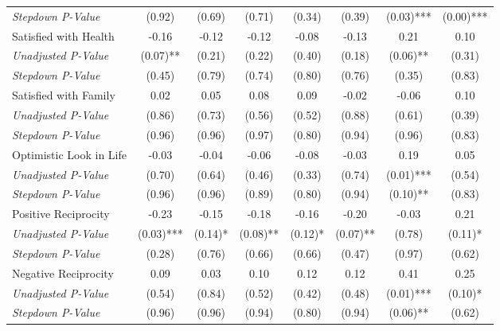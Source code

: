 \begin{tabular}{l c c c c c c c}
\quad \textit{Stepdown P-Value} & (0.92) & (0.69) & (0.71) & (0.34) & (0.39) & (0.03)*** & (0.00)*** \\
Satisfied with Health & -0.16 & -0.12 & -0.12 & -0.08 & -0.13 & 0.21 & 0.10 \\
\quad \textit{Unadjusted P-Value} & (0.07)** & (0.21) & (0.22) & (0.40) & (0.18) & (0.06)** & (0.31) \\
\quad \textit{Stepdown P-Value} & (0.45) & (0.79) & (0.74) & (0.80) & (0.76) & (0.35) & (0.83) \\
Satisfied with Family & 0.02 & 0.05 & 0.08 & 0.09 & -0.02 & -0.06 & 0.10 \\
\quad \textit{Unadjusted P-Value} & (0.86) & (0.73) & (0.56) & (0.52) & (0.88) & (0.61) & (0.39) \\
\quad \textit{Stepdown P-Value} & (0.96) & (0.96) & (0.97) & (0.80) & (0.94) & (0.96) & (0.83) \\
Optimistic Look in Life & -0.03 & -0.04 & -0.06 & -0.08 & -0.03 & 0.19 & 0.05 \\
\quad \textit{Unadjusted P-Value} & (0.70) & (0.64) & (0.46) & (0.33) & (0.74) & (0.01)*** & (0.54) \\
\quad \textit{Stepdown P-Value} & (0.96) & (0.96) & (0.89) & (0.80) & (0.94) & (0.10)** & (0.83) \\
Positive Reciprocity & -0.23 & -0.15 & -0.18 & -0.16 & -0.20 & -0.03 & 0.21 \\
\quad \textit{Unadjusted P-Value} & (0.03)*** & (0.14)* & (0.08)** & (0.12)* & (0.07)** & (0.78) & (0.11)* \\
\quad \textit{Stepdown P-Value} & (0.28) & (0.76) & (0.66) & (0.66) & (0.47) & (0.97) & (0.62) \\
Negative Reciprocity & 0.09 & 0.03 & 0.10 & 0.12 & 0.12 & 0.41 & 0.25 \\
\quad \textit{Unadjusted P-Value} & (0.54) & (0.84) & (0.52) & (0.42) & (0.48) & (0.01)*** & (0.10)* \\
\quad \textit{Stepdown P-Value} & (0.96) & (0.96) & (0.94) & (0.80) & (0.94) & (0.06)** & (0.62) \\
\bottomrule
\end{tabular}
